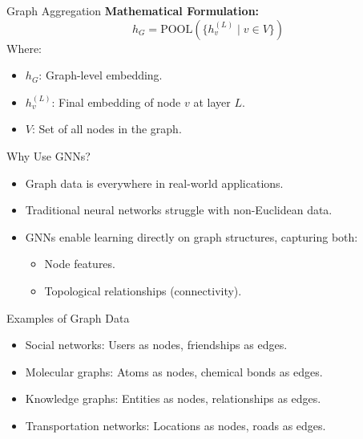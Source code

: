 \documentclass{beamer}
\begin{document}
\begin{frame}{Graph Aggregation}
    \textbf{Mathematical Formulation:}
    \[
    h_G = \text{POOL}\left(\{h_v^{(L)} \mid v \in V\}\right)
    \]
    Where:
    \begin{itemize}
        \item \( h_G \): Graph-level embedding.
        \item \( h_v^{(L)} \): Final embedding of node \( v \) at layer \( L \).
        \item \( V \): Set of all nodes in the graph.
    \end{itemize}
\end{frame}
\begin{frame}{Why Use GNNs?}
    \begin{itemize}
        \item Graph data is everywhere in real-world applications.
        \item Traditional neural networks struggle with non-Euclidean data.
        \item GNNs enable learning directly on graph structures, capturing both:
        \begin{itemize}
            \item Node features.
            \item Topological relationships (connectivity).
        \end{itemize}
    \end{itemize}
\end{frame}

\begin{frame}{Examples of Graph Data}
    \begin{itemize}
        \item Social networks: Users as nodes, friendships as edges.
        \item Molecular graphs: Atoms as nodes, chemical bonds as edges.
        \item Knowledge graphs: Entities as nodes, relationships as edges.
        \item Transportation networks: Locations as nodes, roads as edges.
    \end{itemize}
\end{frame}


\end{document}
